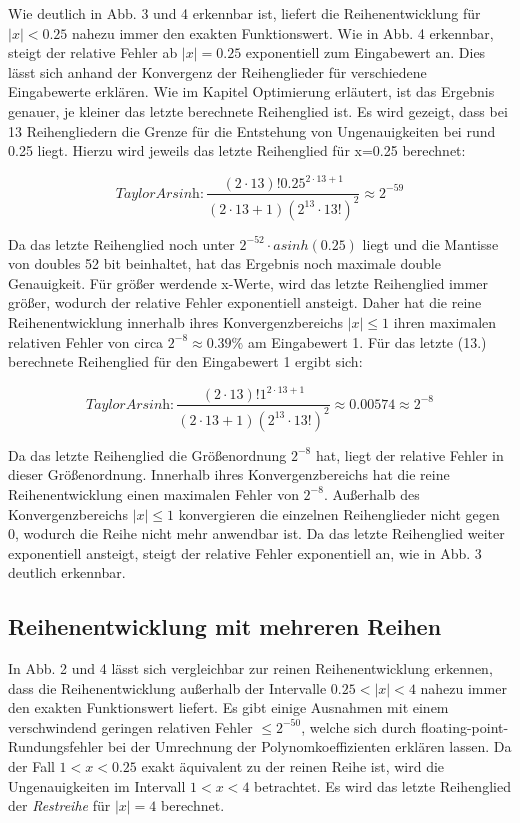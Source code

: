 \documentclass[course=erap] {aspdoc}
\begin{document}
    Wie deutlich in Abb. 3 und 4 erkennbar ist, liefert die Reihenentwicklung für $|x|<0.25$ nahezu immer den exakten Funktionswert.
    Wie in Abb. 4 erkennbar, steigt der relative Fehler ab $|x| = 0.25$ exponentiell zum Eingabewert an.
    Dies lässt sich anhand der Konvergenz der Reihenglieder für verschiedene Eingabewerte erklären.
    Wie im Kapitel Optimierung erläutert, ist das Ergebnis genauer, je kleiner das letzte berechnete Reihenglied ist.
    Es wird gezeigt, dass bei 13 Reihengliedern die Grenze für die Entstehung von Ungenauigkeiten bei rund 0.25 liegt.
    Hierzu wird jeweils das letzte Reihenglied für x=0.25 berechnet:

    \[
        \textit{TaylorArsinh}: \frac{(2\cdot13)!0.25^{2\cdot13 + 1}}{(2\cdot13 + 1)(2^13\cdot13!)^2} \approx 2^{-59}
    \]

    Da das letzte Reihenglied noch unter $2^{-52}\cdot asinh(0.25)$ liegt und die Mantisse von doubles 52 bit beinhaltet, hat das Ergebnis noch maximale double Genauigkeit.
    Für größer werdende x-Werte, wird das letzte Reihenglied immer größer, wodurch der relative Fehler exponentiell ansteigt.
    Daher hat die reine Reihenentwicklung innerhalb ihres Konvergenzbereichs $|x|\leq1$ ihren maximalen relativen Fehler von circa $2^{-8} \approx 0.39\%$ am Eingabewert 1.
    Für das letzte (13.) berechnete Reihenglied für den Eingabewert 1 ergibt sich:

    \[
        \textit{TaylorArsinh}: \frac{(2\cdot13)!1^{2\cdot13 + 1}}{(2\cdot13 + 1)(2^13\cdot13!)^2} \approx 0.00574 \approx 2^{-8}
    \]

    Da das letzte Reihenglied die Größenordnung $2^{-8}$ hat, liegt der relative Fehler in dieser Größenordnung.
    Innerhalb ihres Konvergenzbereichs hat die reine Reihenentwicklung einen maximalen Fehler von $2^{-8}$.
    Außerhalb des Konvergenzbereichs $|x|\leq1$ konvergieren die einzelnen Reihenglieder nicht gegen 0, wodurch die Reihe nicht mehr anwendbar ist.
    Da das letzte Reihenglied weiter exponentiell ansteigt, steigt der relative Fehler exponentiell an, wie in Abb. 3 deutlich erkennbar.

    \subsection{Reihenentwicklung mit mehreren Reihen}\label{subsec:reihenentwicklung-mit-mehreren-reihen}

    In Abb. 2 und 4 lässt sich vergleichbar zur reinen Reihenentwicklung erkennen, dass die Reihenentwicklung außerhalb der Intervalle $0.25<|x|<4$ nahezu immer den exakten Funktionswert liefert.
    Es gibt einige Ausnahmen mit einem verschwindend geringen relativen Fehler $\leq2^{-50}$, welche sich durch floating-point-Rundungsfehler bei der Umrechnung der Polynomkoeffizienten erklären lassen.
    Da der Fall $1<x<0.25$ exakt äquivalent zu der reinen Reihe ist, wird die Ungenauigkeiten im Intervall $1<x<4$ betrachtet.
    Es wird das letzte Reihenglied der \textit{Restreihe} für $|x|=4$ berechnet.
\end{document}
